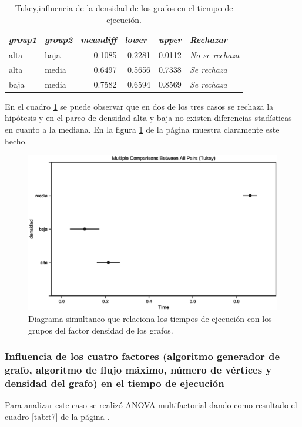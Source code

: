\documentclass{article}
\begin{document}
\begin{table}[htbp]
  \centering
  \caption{Tukey,influencia de la densidad de los grafos en el tiempo de ejecución.}
    \begin{tabular}{llrrrl}
    \toprule
    \textit{\textbf{group1}} & \textit{\textbf{group2}} & \multicolumn{1}{l}{\textit{\textbf{meandiff}}} & \multicolumn{1}{l}{\textit{\textbf{lower}}} & \multicolumn{1}{l}{\textit{\textbf{upper}}} & \textit{\textbf{Rechazar}} \\
    \midrule
    alta  & baja  & -0.1085 & -0.2281 & 0.0112 & \textit{No se rechaza} \\
    alta  & media & 0.6497 & 0.5656 & 0.7338 & \textit{Se rechaza} \\
    baja  & media & 0.7582 & 0.6594 & 0.8569 & \textit{Se rechaza} \\
    \bottomrule
    \end{tabular}%
  \label{tab:t6}%
\end{table}%
En el cuadro \ref{tab:t6} se puede observar que en dos de los tres casos se rechaza la hipótesis y en el pareo de densidad alta y baja no existen diferencias stadísticas en cuanto a la mediana. En la figura \ref{fig9} de la página \pageref{fig9} muestra claramente este hecho.
\begin{center}
\begin{figure}[htbp]
\includegraphics[scale=0.6, width=\textwidth, trim=0 0 0 20, clip=true]{simultaneoustukeydensidad.eps}
\caption{Diagrama simultaneo que relaciona los tiempos de ejecución con los grupos del factor densidad de los grafos.}
\label{fig9}
\end{figure}
\end{center}
\subsubsection{Influencia de los cuatro factores (algoritmo generador de grafo, algoritmo de flujo máximo, número de vértices y densidad del grafo) en el tiempo de ejecución}
Para analizar este caso se realizó ANOVA multifactorial dando como resultado el cuadro \ref{tab:t7} de la página \pageref{tab:t7}.
\end{document}
